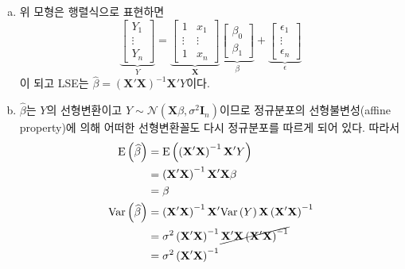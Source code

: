 \documentclass[answers]{exam}
\begin{document}
\begin{questions}
\begin{enumerate}[(a)]
    \end{enumerate}
    \begin{solution}
      \begin{enumerate}[(a)]
        \item 위 모형은 행렬식으로 표현하면
        \begin{equation}
          \underbrace{\begin{bmatrix}Y_{1}\\ \vdots \\ Y_{n}  \end{bmatrix}}_{Y} = \underbrace{\begin{bmatrix}1 & x_{1}\\ \vdots & \vdots \\ 1 & x_{n}  \end{bmatrix}}_{\mathbf{X}}\underbrace{\begin{bmatrix}\beta_{0}\\ \beta_{1}  \end{bmatrix}}_{\beta}+\underbrace{\begin{bmatrix}\epsilon_{1}\\ \vdots \\ \epsilon_{n}  \end{bmatrix}}_{\epsilon}
        \end{equation}
        이 되고 LSE는 $\widehat{\beta}=\left(\mathbf{X}'\mathbf{X}\right)^{-1}\mathbf{X}'Y$이다.
        \item $\widehat{\beta}$는 $Y$의 선형변환이고 $Y\sim \mathcal{N}\left(\mathbf{X}\beta,\sigma^{2}\mathbf{I}_{n}\right)$이므로 정규분포의 선형불변성(affine property)에 의해 어떠한 선형변환꼴도 다시 정규분포를 따르게 되어 있다. 따라서
        \begin{align}
          \mathrm{E}\left(\widehat{\beta}\right) &= \mathrm{E}\left(\left(\mathbf{X}'\mathbf{X}\right)^{-1}\mathbf{X}'Y\right)\\
          &= \left(\mathbf{X}'\mathbf{X}\right)^{-1}\mathbf{X}'\mathbf{X}\beta\\
          &= \beta\\
          \mathrm{Var}\left(\widehat{\beta}\right) &= \left(\mathbf{X}'\mathbf{X}\right)^{-1}\mathbf{X}'\mathrm{Var}\left(Y\right)\mathbf{X}\left(\mathbf{X}'\mathbf{X}\right)^{-1}\\
          &= \sigma^{2}\left(\mathbf{X}'\mathbf{X}\right)^{-1}\cancel{\mathbf{X}'\mathbf{X}\left(\mathbf{X}'\mathbf{X}\right)^{-1}}\\
          &=\sigma^{2}\left(\mathbf{X}'\mathbf{X}\right)^{-1}\\

\end{align}
\end{enumerate}
\end{solution}
\end{questions}
\end{document}
